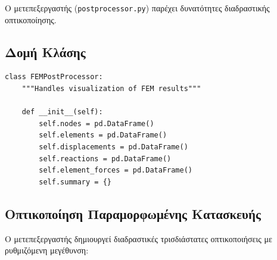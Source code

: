 \documentclass[12pt,a4paper]{article}
\begin{document}
Ο μετεπεξεργαστής (\texttt{postprocessor.py}) παρέχει δυνατότητες διαδραστικής οπτικοποίησης.

\subsection{Δομή Κλάσης}

\begin{lstlisting}[caption={Αρχικοποίηση Κλάσης FEMPostProcessor}]
class FEMPostProcessor:
    """Handles visualization of FEM results"""
    
    def __init__(self):
        self.nodes = pd.DataFrame()
        self.elements = pd.DataFrame()
        self.displacements = pd.DataFrame()
        self.reactions = pd.DataFrame()
        self.element_forces = pd.DataFrame()
        self.summary = {}
\end{lstlisting}

\subsection{Οπτικοποίηση Παραμορφωμένης Κατασκευής}

Ο μετεπεξεργαστής δημιουργεί διαδραστικές τρισδιάστατες οπτικοποιήσεις με ρυθμιζόμενη μεγέθυνση:
\end{document}
